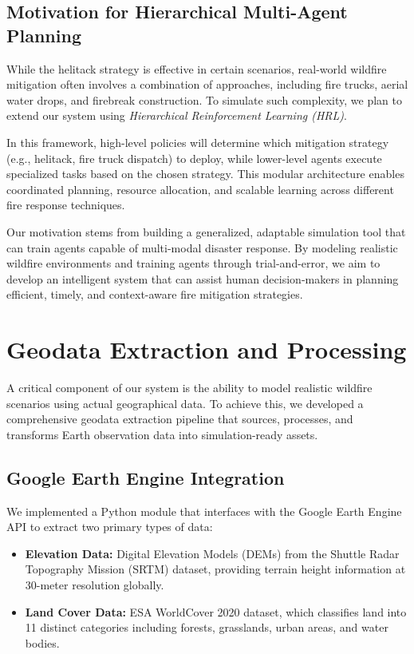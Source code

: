 \documentclass[conference]{IEEEtran}
\begin{document}
\subsection{Motivation for Hierarchical Multi-Agent Planning}
While the helitack strategy is effective in certain scenarios, real-world wildfire mitigation often involves a combination of approaches, including fire trucks, aerial water drops, and firebreak construction. To simulate such complexity, we plan to extend our system using \textit{Hierarchical Reinforcement Learning (HRL)}.

\noindent
In this framework, high-level policies will determine which mitigation strategy (e.g., helitack, fire truck dispatch) to deploy, while lower-level agents execute specialized tasks based on the chosen strategy. This modular architecture enables coordinated planning, resource allocation, and scalable learning across different fire response techniques.

\noindent
Our motivation stems from building a generalized, adaptable simulation tool that can train agents capable of multi-modal disaster response. By modeling realistic wildfire environments and training agents through trial-and-error, we aim to develop an intelligent system that can assist human decision-makers in planning efficient, timely, and context-aware fire mitigation strategies.

\section{Geodata Extraction and Processing}

A critical component of our system is the ability to model realistic wildfire scenarios using actual geographical data. To achieve this, we developed a comprehensive geodata extraction pipeline that sources, processes, and transforms Earth observation data into simulation-ready assets.

\subsection{Google Earth Engine Integration}
We implemented a Python module that interfaces with the Google Earth Engine API to extract two primary types of data:

\begin{itemize}
    \item \textbf{Elevation Data:} Digital Elevation Models (DEMs) from the Shuttle Radar Topography Mission (SRTM) dataset, providing terrain height information at 30-meter resolution globally.
    \item \textbf{Land Cover Data:} ESA WorldCover 2020 dataset, which classifies land into 11 distinct categories including forests, grasslands, urban areas, and water bodies.
\end{itemize}
\end{document}
